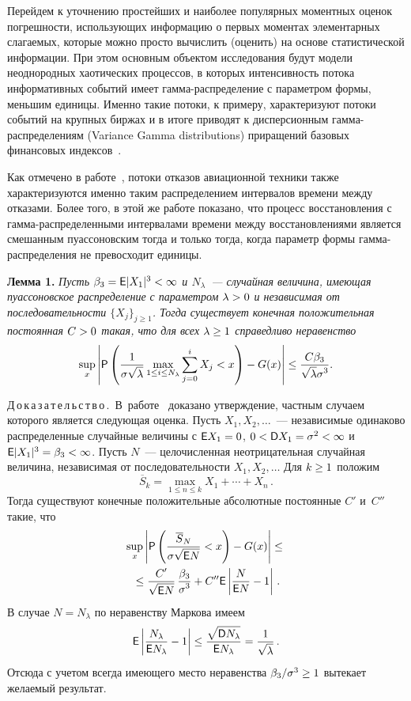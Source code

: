 \begin{multicols}{2}
Перейдем к уточнению простейших и наиболее популярных моментных
оценок погрешности, использующих информацию о первых моментах
элементарных слагаемых, которые можно просто вычислить (оценить) на
основе статистической информации. При этом основным объектом
исследования будут модели неоднородных хаотических процессов, в
которых интенсивность потока информативных событий имеет
гам\-ма-рас\-пре\-де\-ле\-ние с параметром формы, меньшим единицы. Именно
такие потоки, к примеру, характеризуют потоки событий на крупных
биржах и в итоге приводят к дисперсионным гам\-ма-рас\-пре\-де\-ле\-ни\-ям
(Variance Gamma distributions) приращений базовых финансовых
индексов~\cite{KorolevSokolov2012}. 

Как отмечено в работе~\cite{Gleser1987}, 
потоки отказов авиационной техники также
характеризуются именно таким распределением интервалов времени между
отказами. Более того, в этой же работе показано, что процесс
восстановления с гам\-ма-рас\-пре\-де\-лен\-ны\-ми интервалами времени между
восстановлениями является смешанным пуассоновским тогда и только
тогда, когда параметр формы гам\-ма-рас\-пре\-де\-ле\-ния не превосходит
единицы.

\smallskip

\noindent
\textbf{Лемма 1.} \textit{Пусть $\beta_3\hm={\sf E}|X_1|^3\hm<\infty$ и
$N_{\lambda}$~--- случайная величина, имеющая пуассоновское
распределение с параметром $\lambda \hm>0$ и независимая от
последовательности $\{X_j\}_{j\ge 1}$. Тогда существует конечная
положительная постоянная $C\hm>0$ такая, что для всех $\lambda \hm\ge 1$
справедливо неравенство}
$$
\sup\limits_{x} \left\vert{\sf P}\left(\displaystyle\frac{\displaystyle 1\mathstrut}{\displaystyle \sigma\sqrt{\lambda}\mathstrut}
\max\limits_{1\le i\le N_{\lambda}}\sum\limits_{j=0}^{i}
X_j<x\right)-G(x)\right\vert \le
\displaystyle\frac{\displaystyle C\beta_3\mathstrut}{\displaystyle \sqrt{\lambda}\sigma^3\mathstrut}.
$$

\smallskip

\noindent
Д\,о\,к\,а\,з\,а\,т\,е\,л\,ь\,с\,т\,в\,о\,.\ В~работе~\cite{KorolevSelivanova1995}
доказано утверждение, частным случаем которого является следующая
оценка. Пусть $X_1,X_2,\ldots$~--- независимые одинаково
распределенные случайные величины с ${\sf E}X_1\hm=0$, $0\hm<{\sf
D}X_1\hm=\sigma^2\hm<\infty$ и ${\sf E}|X_1|^3\hm=\beta_3\hm<\infty$. Пусть $N$~--- 
целочисленная неотрицательная случайная величина, независимая от
последовательности $X_1,X_2,\ldots$ Для $k\hm\ge 1$ положим 
$$
\overline
S_k=\max\limits_{1\le n\le k}X_1+ \cdots+X_n\,.
$$ 
Тогда существуют конечные
положительные абсолютные постоянные $C'$ и~$C''$ такие, что
\begin{multline*}
\sup\limits_x \left\vert{\sf P}\left(\displaystyle\frac{\displaystyle \overline S_N\mathstrut}{\displaystyle \sigma\sqrt{{\sf
E}N}\mathstrut}< x\right)-G(x)\right\vert\le{}\\
{}\le\displaystyle\frac{\displaystyle C'\mathstrut}{\displaystyle \sqrt{{\sf
E}N}\mathstrut}\,\displaystyle\frac{\displaystyle \beta_3\mathstrut}{\displaystyle \sigma^3\mathstrut}+ C''{\sf E}\left\vert\displaystyle\frac{\displaystyle N\mathstrut}{\displaystyle {\sf
E}N\mathstrut}-1\right\vert\,.
\end{multline*}
В случае $N=N_{\lambda}$ по неравенству Маркова имеем
$$
{\sf E}\left\vert\displaystyle\frac{\displaystyle N_{\lambda}\mathstrut}{\displaystyle {\sf
E}N_{\lambda}\mathstrut}-1\right\vert\le\displaystyle\frac{\displaystyle \sqrt{{\sf D}N_{\lambda}}\mathstrut}{\displaystyle {\sf
E}N_{\lambda}\mathstrut}=\displaystyle\frac{\displaystyle 1\mathstrut}{\displaystyle \sqrt{\lambda}\mathstrut}\,.
$$
Отсюда с учетом всегда имеющего место неравенства
$\beta_3/\sigma^3\hm\ge 1$ вытекает желаемый результат.


\end{multicols}
